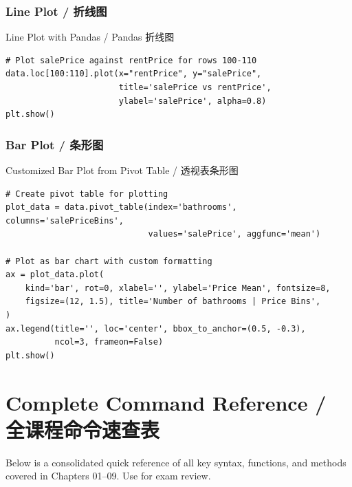 \documentclass[11pt,a4paper]{report}
\begin{document}
\subsection{Line Plot / 折线图}

\begin{examplebox}{Line Plot with Pandas / Pandas 折线图}
\begin{lstlisting}
# Plot salePrice against rentPrice for rows 100-110
data.loc[100:110].plot(x="rentPrice", y="salePrice",
                       title='salePrice vs rentPrice',
                       ylabel='salePrice', alpha=0.8)
plt.show()
\end{lstlisting}
\end{examplebox}

\subsection{Bar Plot / 条形图}

\begin{examplebox}{Customized Bar Plot from Pivot Table / 透视表条形图}
\begin{lstlisting}
# Create pivot table for plotting
plot_data = data.pivot_table(index='bathrooms', columns='salePriceBins',
                             values='salePrice', aggfunc='mean')

# Plot as bar chart with custom formatting
ax = plot_data.plot(
    kind='bar', rot=0, xlabel='', ylabel='Price Mean', fontsize=8,
    figsize=(12, 1.5), title='Number of bathrooms | Price Bins',
)
ax.legend(title='', loc='center', bbox_to_anchor=(0.5, -0.3),
          ncol=3, frameon=False)
plt.show()
\end{lstlisting}
\end{examplebox}

\newpage

\appendix
\chapter{Complete Command Reference / 全课程命令速查表}

Below is a consolidated quick reference of all key syntax, functions, and methods covered in Chapters 01--09. Use for exam review.
\vspace{1em}

\end{document}

